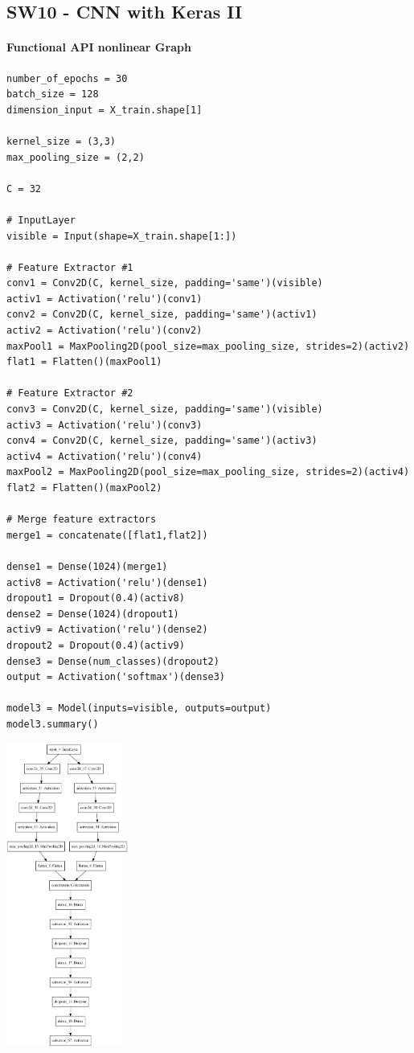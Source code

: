 \documentclass[11pt]{article}
\begin{document}
\subsection{SW10 - CNN with Keras II}
\paragraph{Functional API nonlinear Graph}
\begin{verbatim}
number_of_epochs = 30
batch_size = 128
dimension_input = X_train.shape[1]

kernel_size = (3,3)
max_pooling_size = (2,2)

C = 32

# InputLayer
visible = Input(shape=X_train.shape[1:])

# Feature Extractor #1
conv1 = Conv2D(C, kernel_size, padding='same')(visible)
activ1 = Activation('relu')(conv1)
conv2 = Conv2D(C, kernel_size, padding='same')(activ1)
activ2 = Activation('relu')(conv2)
maxPool1 = MaxPooling2D(pool_size=max_pooling_size, strides=2)(activ2)
flat1 = Flatten()(maxPool1)

# Feature Extractor #2
conv3 = Conv2D(C, kernel_size, padding='same')(visible)
activ3 = Activation('relu')(conv3)
conv4 = Conv2D(C, kernel_size, padding='same')(activ3)
activ4 = Activation('relu')(conv4)
maxPool2 = MaxPooling2D(pool_size=max_pooling_size, strides=2)(activ4)
flat2 = Flatten()(maxPool2)

# Merge feature extractors
merge1 = concatenate([flat1,flat2])

dense1 = Dense(1024)(merge1)
activ8 = Activation('relu')(dense1)
dropout1 = Dropout(0.4)(activ8)
dense2 = Dense(1024)(dropout1)
activ9 = Activation('relu')(dense2)
dropout2 = Dropout(0.4)(activ9)
dense3 = Dense(num_classes)(dropout2)
output = Activation('softmax')(dense3)

model3 = Model(inputs=visible, outputs=output)
model3.summary()
\end{verbatim}

\begin{center}
	\includegraphics[height=10cm,keepaspectratio]{img/functional_api_nonlinear_graph}
\end{center}
\end{document}
